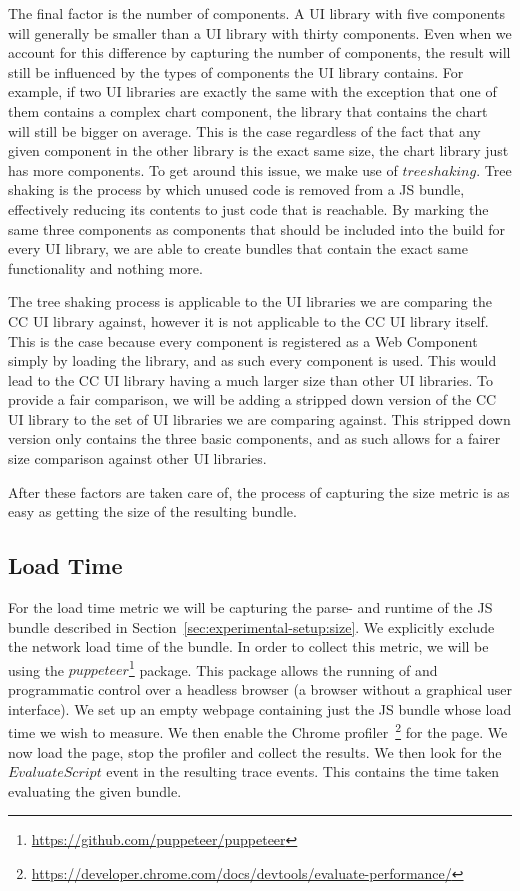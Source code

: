 The final factor is the number of components. A UI library with five components will generally be smaller than a UI library with thirty components. Even when we account for this difference by capturing the number of components, the result will still be influenced by the types of components the UI library contains. For example, if two UI libraries are exactly the same with the exception that one of them contains a complex chart component, the library that contains the chart will still be bigger on average. This is the case regardless of the fact that any given component in the other library is the exact same size, the chart library just has more components. To get around this issue, we make use of \(tree shaking\). Tree shaking is the process by which unused code is removed from a JS bundle, effectively reducing its contents to just code that is reachable. By marking the same three components as components that should be included into the build for every UI library, we are able to create bundles that contain the exact same functionality and nothing more.

The tree shaking process is applicable to the UI libraries we are comparing the CC UI library against, however it is not applicable to the CC UI library itself. This is the case because every component is registered as a Web Component simply by loading the library, and as such every component is used. This would lead to the CC UI library having a much larger size than other UI libraries. To provide a fair comparison, we will be adding a stripped down version of the CC UI library to the set of UI libraries we are comparing against. This stripped down version only contains the three basic components, and as such allows for a fairer size comparison against other UI libraries.

After these factors are taken care of, the process of capturing the size metric is as easy as getting the size of the resulting bundle.

\subsection{Load Time}
For the load time metric we will be capturing the parse- and runtime of the JS bundle described in Section~\ref{sec:experimental-setup:size}. We explicitly exclude the network load time of the bundle. In order to collect this metric, we will be using the \(puppeteer\)\footnote{\url{https://github.com/puppeteer/puppeteer}} package. This package allows the running of and programmatic control over a headless browser (a browser without a graphical user interface). We set up an empty webpage containing just the JS bundle whose load time we wish to measure. We then enable the Chrome profiler~\footnote{\url{https://developer.chrome.com/docs/devtools/evaluate-performance/}} for the page. We now load the page, stop the profiler and collect the results. We then look for the \(EvaluateScript\) event in the resulting trace events. This contains the time taken evaluating the given bundle.

